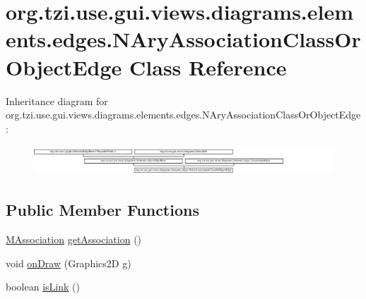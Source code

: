 \hypertarget{classorg_1_1tzi_1_1use_1_1gui_1_1views_1_1diagrams_1_1elements_1_1edges_1_1_n_ary_association_class_or_object_edge}{\section{org.\-tzi.\-use.\-gui.\-views.\-diagrams.\-elements.\-edges.\-N\-Ary\-Association\-Class\-Or\-Object\-Edge Class Reference}
\label{classorg_1_1tzi_1_1use_1_1gui_1_1views_1_1diagrams_1_1elements_1_1edges_1_1_n_ary_association_class_or_object_edge}
}
Inheritance diagram for org.\-tzi.\-use.\-gui.\-views.\-diagrams.\-elements.\-edges.\-N\-Ary\-Association\-Class\-Or\-Object\-Edge\-:\begin{figure}[H]
\begin{center}
\leavevmode
\includegraphics[height=1.135903cm]{classorg_1_1tzi_1_1use_1_1gui_1_1views_1_1diagrams_1_1elements_1_1edges_1_1_n_ary_association_class_or_object_edge}
\end{center}
\end{figure}
\subsection*{Public Member Functions}
\begin{DoxyCompactItemize}
\item 
\hyperlink{interfaceorg_1_1tzi_1_1use_1_1uml_1_1mm_1_1_m_association}{M\-Association} \hyperlink{classorg_1_1tzi_1_1use_1_1gui_1_1views_1_1diagrams_1_1elements_1_1edges_1_1_n_ary_association_class_or_object_edge_a8c18979fd646e4e36a7d9ea94c84ef2a}{get\-Association} ()
\item 
void \hyperlink{classorg_1_1tzi_1_1use_1_1gui_1_1views_1_1diagrams_1_1elements_1_1edges_1_1_n_ary_association_class_or_object_edge_a0ae20c2f8221ac8629697bbc2e14601a}{on\-Draw} (Graphics2\-D g)
\item 
boolean \hyperlink{classorg_1_1tzi_1_1use_1_1gui_1_1views_1_1diagrams_1_1elements_1_1edges_1_1_n_ary_association_class_or_object_edge_a405ced836f9b435920648fec28c9b089}{is\-Link} ()
\end{DoxyCompactItemize}
